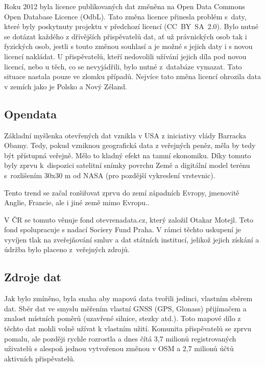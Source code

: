 Roku 2012 byla licence publikovaných dat změněna na Open Data Commons 
Open Database Licence (OdbL). Tato změna licence přinesla problém 
s~daty, které byly poskytnuty projektu v předchozí licencí 
(CC­~BY~SA~2.0). Bylo nutné se dotázat každého z dřívějších 
přispěvatelů dat, ať už právnických osob tak i fyzických osob, jestli 
s touto změnou souhlasí a je možné s jejich daty i s novou licencí 
nakládat. U přispěvatelů, kteří nedovolili užívání jejich díla 
pod novou licencí, nebo u těch, co se nevyjádřili, bylo nutné 
z~databáze vymazat. Tato situace nastala pouze ve zlomku případů. 
Nejvíce tato změna licencí ohrozila data v zemích jako je Polsko a Nový Zéland.
\cite {OSMlicenceIssue} 

\subsection{Opendata}
\label{opendata}
Základní myšlenka otevřených dat vznikla v USA z iniciativy vlády Barracka Obamy. 
Tedy, pokud vzniknou geografická data z veřejných peněz, měla by tedy být 
přístupná veřejně. Mělo to kladný efekt na tamní ekonomiku. Díky tomuto byly 
zprvu k~dispozici satelitní snímky povrchu Země a digitální model terénu 
s~rozlišením 30x30 m od NASA (pro pozdější vykreslení vrstevnic). 

Tento trend se začal rozšiřovat zprvu do zemí západních Evropy,
jmenovitě Anglie, Francie, ale i jiné země mimo Evropu..  

V ČR se tomuto věnuje fond otevrenadata.cz, který založil Otakar 
Motejl. Teto fond spolupracuje s nadací Sociery Fund Praha. V rámci 
těchto uskupení je vyvíjen tlak na zveřejňování smluv a dat 
státních institucí, jelikož jejich získání a údržba bylo placeno 
z~veřejných zdrojů.

\subsection{Zdroje dat}
\label{opendata}

Jak bylo zmíněno, byla snaha aby mapová data tvořili jedinci, vlastním 
sběrem dat. Sběr dat ve smyslu měřením vlastní GNSS (GPS, Glonass) 
přijímačem a znalost místních poměrů (uzavřené silnice, stezky atd.). 
Toto mapové dílo z těchto dat mohli volně užívat k vlastním užití. 
Komunita přispěvatelů se zprvu pomalu, ale později rychle rozrostla a 
dnes čítá 3,7 milionů registrovaných uživatelů s alespoň jednou 
vytvořenou změnou v OSM a 2,7 milionů účtů aktivních přispěvatelů. \cite{OSMstats}

